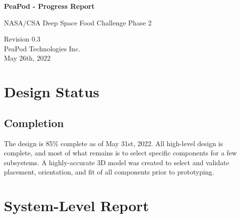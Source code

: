 \documentclass{../tex/report}
\begin{document}
\begin{titlepage}
    \begin{center}
        \vspace*{1.2cm}

        \textbf{\large{PeaPod - Progress Report}}

        \vspace{0.5cm}

        NASA/CSA Deep Space Food Challenge Phase 2

        \vfill
        
        \vspace{.75cm}

        Revision 0.3\\
        PeaPod Technologies Inc.\\
        May 26th, 2022

    \end{center}
\end{titlepage}

\thispagestyle{plain}

\tableofcontents
\clearpage

\section{Design Status}

\subsection{Completion}

The design is 85\% complete as of May 31st, 2022. All high-level design is complete, and most of what remains is to select specific components for a few subsystems. A highly-accurate 3D model was created to select and validate placement, orientation, and fit of all components prior to prototyping.



\clearpage

\section{System-Level Report}



\clearpage


\end{document}
